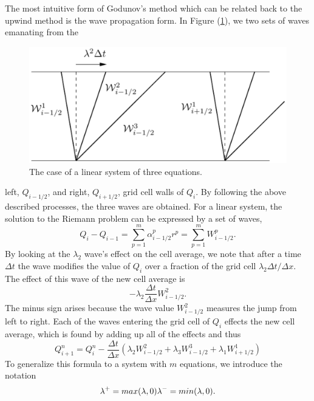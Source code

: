 \documentclass[]{article}
\begin{document}
	The most intuitive form of Godunov's method which can be related back to the upwind method is the wave propagation form. In Figure (\ref{WavePropGodMeth}), we two sets of waves emanating from the
	\begin{figure}[h] 	
		\centering
		\includegraphics[scale=.50]{WavePropGodMeth}
		\caption{The case of a linear system of three equations.}
		\label{WavePropGodMeth}
	\end{figure}
	left, $ Q_{i-1/2} $, and right, $ Q_{i+1/2} $, grid cell walls of $ Q_i $. By following the above described processes, the three waves are obtained. For a linear system, the solution to the Riemann problem can be expressed by a set of waves,
	\begin{equation}
		Q_{i} - Q_{i-1} = \sum_{p = 1}^{m} \alpha^p_{i-1/2}r^p = \sum_{p = 1}^{m}W^p_{i-1/2}.
	\end{equation}
	By looking at the $ \lambda_2 $ wave's effect on the cell average, we note that after a time $ \Delta t $ the wave modifies the value of $ Q_i $ over a fraction of the grid cell $ \lambda_2 \Delta t / \Delta x $. The effect of this wave of the new cell average is
	\begin{equation}
		-\lambda_2 \frac{\Delta t}{\Delta x}W_{i-1/2}^2.
	\end{equation}
	The minus sign arises because the wave value $ W_{i-1/2}^2 $ measures the jump from left to right. Each of the waves entering the grid cell of $ Q_{i} $ effects the new cell average, which is found by adding up all of the effects and thus
	\begin{equation}
		Q^n_{i+1} = Q_i^n - \frac{\Delta t}{\Delta x} (\lambda_2 W^2_{i-1/2} + \lambda_3 W^3_{i-1/2} + \lambda_1 W^1_{i+1/2})
	\end{equation}
	To generalize this formula to a system with $ m $ equations, we introduce the notation
	\begin{equation}
		\lambda^+ = max(\lambda, 0) \space \lambda^- = min(\lambda, 0).
	\end{equation}
\end{document}

